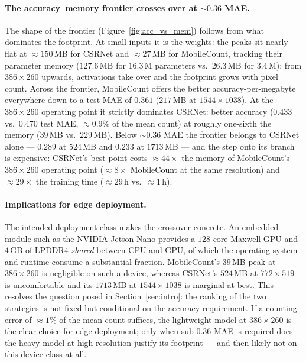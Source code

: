 \paragraph{The accuracy--memory frontier crosses over at
${\sim}0.36$ MAE.} The shape of the frontier
(Figure~\ref{fig:acc_vs_mem}) follows from what dominates the
footprint. At small inputs it is the weights: the peaks sit nearly
flat at ${\approx}150$\,MB for CSRNet and ${\approx}27$\,MB for
MobileCount, tracking their parameter memory ($127.6$\,MB for
$16.3$\,M parameters vs.\ $26.3$\,MB for $3.4$\,M); from
$386\times260$ upwards, activations take over and the footprint grows
with pixel count. Across the frontier, MobileCount offers the better
accuracy-per-megabyte everywhere down to a test MAE of $0.361$
($217$\,MB at $1544\times1038$). At the $386\times260$ operating point
it strictly dominates CSRNet: better accuracy ($0.433$ vs.\ $0.470$
test MAE, ${\approx}0.9\%$ of the mean count) at roughly one-sixth the
memory ($39$\,MB vs.\ $229$\,MB). Below ${\sim}0.36$ MAE the frontier
belongs to CSRNet alone — $0.289$ at $524$\,MB and $0.233$ at
$1713$\,MB — and the step onto its branch is expensive: CSRNet's best
point costs ${\approx}44\times$ the memory of MobileCount's
$386\times260$ operating point (${\approx}8\times$ MobileCount at the
same resolution) and ${\approx}29\times$ the training time
(${\approx}29$\,h vs.\ ${\approx}1$\,h).

\paragraph{Implications for edge deployment.}
The intended deployment class makes the crossover concrete. An
embedded module such as the NVIDIA Jetson Nano provides a $128$-core
Maxwell GPU and $4$\,GB of LPDDR4 \emph{shared} between CPU and GPU,
of which the operating system and runtime consume a substantial
fraction.
MobileCount's $39$\,MB peak at $386\times260$ is negligible on such a
device, whereas CSRNet's $524$\,MB at $772\times519$ is uncomfortable
and its $1713$\,MB at $1544\times1038$ is marginal at best. This
resolves the question posed in Section~\ref{sec:intro}: the ranking of
the two strategies is not fixed but conditional on the accuracy
requirement. If a counting error of ${\approx}1\%$ of the mean count
suffices, the lightweight model at $386\times260$ is the clear choice
for edge deployment; only when sub-$0.36$ MAE is required does the
heavy model at high resolution justify its footprint — and then likely
not on this device class at all.

